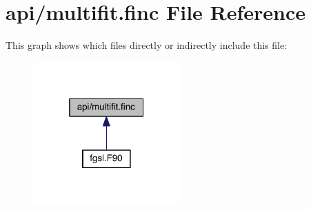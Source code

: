 \hypertarget{multifit_8finc}{\section{api/multifit.finc File Reference}
\label{multifit_8finc}
}
This graph shows which files directly or indirectly include this file\-:
\nopagebreak
\begin{figure}[H]
\begin{center}
\leavevmode
\includegraphics[width=160pt]{multifit_8finc__dep__incl}
\end{center}
\end{figure}
